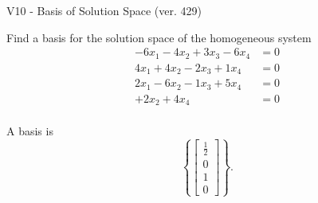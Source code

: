 \begin{exercise}
  \begin{exerciseTitle}V10 - Basis of Solution Space (ver. 429)\end{exerciseTitle}
  \begin{exerciseStatement}
    Find a basis for the solution space of the homogeneous system 
\begin{align*}
 -6 x_ 1 -4 x_ 2 + 3 x_ 3 -6 x_ 4 &= 0  \\ 
  4 x_ 1 + 4 x_ 2 -2 x_ 3 + 1 x_ 4 &= 0  \\ 
  2 x_ 1 -6 x_ 2 -1 x_ 3 + 5 x_ 4 &= 0  \\ 
  + 2 x_ 2 + 4 x_ 4 &= 0  \\ 
 \end{align*}


 
  \end{exerciseStatement}

  \begin{exerciseAnswer}
   A basis is   
\[\left\{\left[\begin{array}{c}
\frac{1}{2} \\
0 \\
1 \\
0
\end{array}\right]\right\}.\]

  


  \end{exerciseAnswer}
\end{exercise}